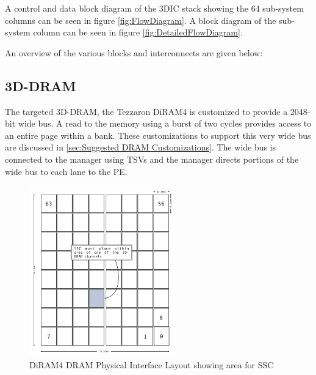 \documentclass[journal]{IEEEtran}
\begin{document}
\bigskip
A control and data block diagram of the 3DIC stack showing the 64 sub-system columns can be seen in figure \ref{fig:FlowDiagram}.
A block diagram of the sub-system column can be seen in figure \ref{fig:DetailedFlowDiagram}. 

\bigskip
An overview of the various blocks and interconnects are given below:

\subsection{3D-DRAM}
The targeted 3D-DRAM, the Tezzaron DiRAM4 is customized to provide a 2048-bit wide bus. A read to the memory using a burst of two cycles provides access to an entire page within a bank.
These customizations to support this very wide bus are discussed in \ref{sec:Suggested DRAM Customizations}.
The wide bus is connected to the manager using TSVs and the manager directs portions of the wide bus to each lane to the PE.
\begin{figure}[!t]
\captionsetup{width=.9\linewidth}
\centerline{
\mbox{\includegraphics[width=2.5in]{DiRAM4Layout.jpg}}
}
\caption{DiRAM4 DRAM Physical Interface Layout\cite{tezzaron:diram4}\cite{patti2014} showing area for SSC }
\label{fig:diram4Layout}
\end{figure}


\end{document}

